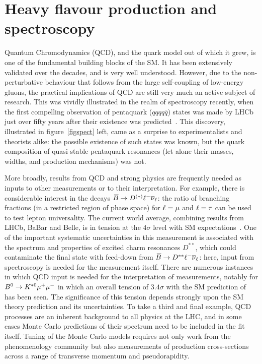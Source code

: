 \section{Heavy flavour production and spectroscopy }



Quantum Chromodynamics (QCD), and the quark model out of which it grew, 
is one of the fundamental building blocks of the SM.
It has been extensively validated over the decades, and is
very well understood. However, due to the non-perturbative behaviour
that follows from the large self-coupling of low-energy gluons,
the practical implications of QCD are still
very much an active subject of research. This was vividly illustrated
in the realm of spectroscopy recently, when the first compelling
observation of pentaquark ($qqqq\bar{q}$) states was made by LHCb~\cite{Aaij:2015tga}
just over fifty years after their existence was predicted~\cite{GellMann:1964nj}.
This discovery, illustrated in figure~\ref{figspect} left, came as a surprise to experimentalists and theorists alike:
the possible existence of such states was known, but the quark composition of
quasi-stable pentaquark resonances (let alone their masses, widths, and
production mechanisms) was not.

More broadly, results from QCD and strong physics are frequently
needed as inputs to other measurements or to their interpretation.
For example, there is considerable interest in the decays
${\kern 0.18em\overline{\kern -0.18em B}{}} \rightarrow D^{(*)} {\ell}^- {{\overline{\nu}}_\ell}$: the ratio of branching fractions
(in a restricted region of phase space) for ${\ell}={\mu}$ and ${\ell}={\tau}$
can be used to test lepton universality. The current world average,
combining results from LHCb, BaBar and Belle, is in tension
at the $4\sigma$ level with SM expectations~\cite{bib:hfag}.
One of the important systematic uncertainties in this measurement
is associated with the spectrum and properties of excited charm resonances $D^{**}$,
which could contaminate the final state with feed-down from
${\kern 0.18em\overline{\kern -0.18em B}{}} \rightarrow D^{**} {\ell}^- {{\overline{\nu}}_\ell}$: here, input from spectroscopy is
needed for the measurement itself. There are numerous instances
in which QCD input is needed for the interpretation of measurements,
notably for ${{B}^0} \rightarrow {\ensuremath{{K}^{*0}}} {\ensuremath{\mu^+}} {\ensuremath{\mu^-}}$ in which 
an overall tension of $3.4\sigma$ with the SM prediction of~\cite{Descotes-Genon:2014uoa} has been seen. 
The significance of this 
tension depends strongly upon the SM theory prediction and its
uncertainties. To take a third and final example, QCD processes are
an inherent background to all physics at the LHC, and in some cases
Monte Carlo predictions of their spectrum need to be included in the
fit itself. Tuning of the Monte Carlo models requires not only work
from the phenomenology community but also measurements of production
cross-sections across a range of transverse momentum and
pseudorapidity.

